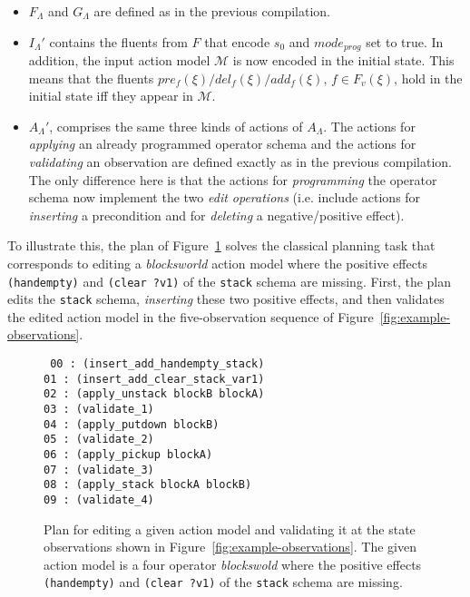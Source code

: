 \documentclass[3p,times]{elsarticle}
\begin{document}
\begin{itemize}
\item $F_{\Lambda}$ and $G_{\Lambda}$ are defined as in the previous compilation.
\item $I_{\Lambda}'$ contains the fluents from $F$ that encode $s_0$ and $mode_{prog}$ set to true. In addition, the input action model $\mathcal{M}$ is now encoded in the initial state. This means that the fluents $pre_f(\xi)/del_f(\xi)/add_f(\xi)$, $f\in F_v(\xi)$, hold in the initial state iff they appear in $\mathcal{M}$.
\item $A_{\Lambda}'$, comprises the same three kinds of actions of $A_{\Lambda}$. The actions for {\em applying} an already programmed operator schema and the actions for {\em validating} an observation are defined exactly as in the previous compilation. The only difference here is that the actions for {\em programming} the operator schema now implement the two {\em edit operations} (i.e. include actions for {\em inserting} a precondition and for {\em deleting} a negative/positive effect).
\end{itemize}

To illustrate this, the plan of Figure~\ref{fig:plan-odistance} solves the classical planning task that corresponds to editing a \emph{blocksworld} action model where the positive effects {\tt\small (handempty)} and {\tt\small (clear ?v1)} of the {\tt\small stack} schema are missing. First, the plan edits the {\tt\small stack} schema, {\em inserting} these two positive effects, and then validates the edited action model in the five-observation sequence of Figure~\ref{fig:example-observations}.

\begin{figure}[hbt!]
{\tt\small
00 : (insert\_add\_handempty\_stack)\\
01 : (insert\_add\_clear\_stack\_var1)\\
02 : (apply\_unstack blockB blockA)\\
03 : (validate\_1)\\
04 : (apply\_putdown blockB)\\
05 : (validate\_2)\\
06 : (apply\_pickup blockA)\\
07 : (validate\_3)\\
08 : (apply\_stack blockA blockB)\\
09 : (validate\_4)\\
}
\caption{\small Plan for editing a given action model and validating it at the state observations shown in Figure~\ref{fig:example-observations}. The given action model is a four operator {\em blockswold} where the positive effects {\tt\small (handempty)} and {\tt\small (clear ?v1)} of the {\tt\small stack} schema are missing.}
\label{fig:plan-odistance}
\end{figure}
\end{document}
